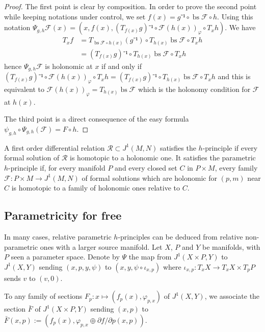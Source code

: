 \documentclass[10pt,a4paper]{article}
\newcommand{\Rel}{\mathcal{R}} %
\newcommand{\F}{\mathcal{F}} %
\DeclareMathOperator{\bs}{bs} %
\newcommand{\uses}[1]{}
\newcommand{\lean}[1]{}
\newcommand{\leanok}{}
\begin{document}
\begin{proof}
  \leanok
  \uses{lem:one_jet_extension_prop}
  The first point is clear by composition. In order to prove the second point
  while keeping notations under control, we set
  $f(x) = g⁻¹ ∘ \bs\F ∘ h$. Using this notation
  $Ψ_{g, h}\F(x) = (x, f(x), (T_{f(x)}g)⁻¹ ∘ \F(h(x))_φ ∘ T_xh)$. We have
  \begin{align*}
    T_x f &= T_{\bs\F ∘ h(x)}(g⁻¹) ∘ T_{h(x)}\bs\F ∘ T_x h\\
          &= \left(T_{f(x)}g\right)⁻¹ ∘ T_{h(x)}\bs\F ∘ T_x h
  \end{align*}
  hence $Ψ_{g, h}\F$ is holonomic at $x$ if and only if
  $\left(T_{f(x)}g\right)⁻¹ ∘ \F(h(x))_φ ∘ T_xh = \left(T_{f(x)}g\right)⁻¹ ∘ T_{h(x)}\bs\F ∘ T_x h$
  and this is equivalent to $\F(h(x))_φ = T_{h(x)}\bs\F$ which is the holonomy condition for
  $\F$ at $h(x)$.

  The third point is a direct consequence of the easy formula $ψ_{g, h} ∘ Ψ_{g, h}(\F) = F ∘ h$.
\end{proof}

\begin{definition}
  \label{def:h-princ}
  \leanok
  \lean{RelMfld.SatisfiesHPrinciple, RelMfld.SatisfiesHPrincipleWith}
  \uses{def:htpy_formal_sol}
  A first order differential relation $\Rel ⊂ J^1(M, N)$ satisfies the
  $h$-principle if every formal solution of $\Rel$ is homotopic to a
  holonomic one.
  It satisfies the parametric $h$-principle if, for every manifold $P$
  and every closed set $C$ in $P × M$, every family $\F : P × M → J^1(M, N)$ of formal
  solutions which are holonomic for $(p, m)$ near $C$
  is homotopic to a family of holonomic ones relative to $C$.
\end{definition}


\subsection*{Parametricity for free}

In many cases, relative parametric $h$-principles can be deduced from relative
non-parametric ones with a larger source manifold.
Let $X$, $P$ and $Y$ be manifolds, with $P$ seen a parameter space.
Denote by $Ψ$ the map from $J^1(X × P, Y)$ to $J^1(X, Y)$ sending $(x, p, y, ψ)$ to
$(x, y, ψ ∘ ι_{x, p})$ where $ι_{x, p} : T_xX → T_xX × T_pP$ sends $v$ to $(v, 0)$.

To any family of sections $F_p : x ↦ (f_p(x), φ_{p, x})$ of $J^1(X, Y)$, we
associate the section $\bar F$ of $J^1(X × P, Y)$ sending $(x, p)$ to
$\bar F(x, p) := (f_p(x), φ_{p, x} ⊕ ∂f/∂p(x, p))$.
\end{document}

